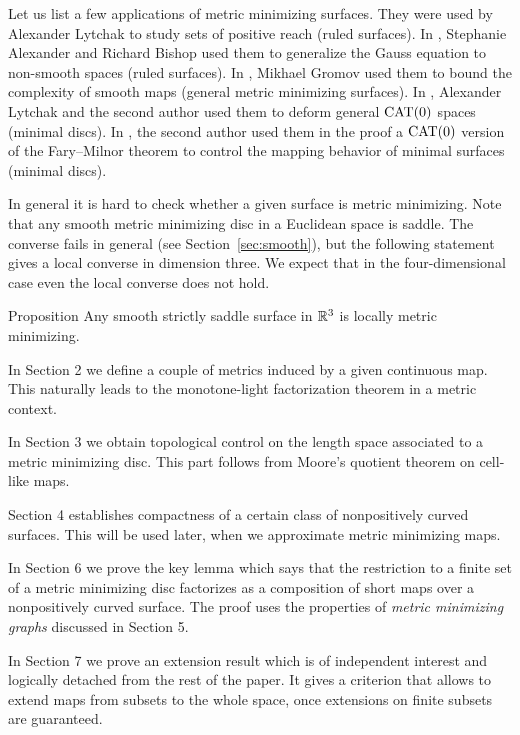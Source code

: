 \documentclass{article}
\begin{document}
Let us list a few applications of metric minimizing surfaces.
They were used by Alexander Lytchak \cite{L} to study sets of positive reach (ruled surfaces).
In  \cite{AB}, Stephanie Alexander and Richard Bishop used them to generalize the Gauss equation to non-smooth spaces (ruled surfaces).
In \cite{G}, Mikhael Gromov used them to bound the complexity of smooth maps (general metric minimizing surfaces).
In \cite{LS}, Alexander Lytchak and the second author used them to deform general $\mathop{\rm CAT}\nolimits(0)$ spaces (minimal discs).
In \cite{St}, the second author used them in the proof a $\mathop{\rm CAT}\nolimits(0)$ version of the Fary--Milnor theorem to control the mapping behavior of minimal surfaces (minimal discs).  

In general it is hard to check whether a given surface is metric minimizing.
Note that any smooth metric minimizing disc in a Euclidean space is saddle.
The converse fails in general (see Section~\ref{sec:smooth}), but the following statement gives a local converse in dimension three.
We expect that in the four-dimensional case even the local converse does not hold.

\begin{thm}{Proposition}\label{prop:smooth}
Any smooth strictly saddle surface in $\mathbb{R}^3$ is locally metric minimizing.
\end{thm}
 


In Section 2 we define a couple of metrics induced by a given continuous map.
This naturally leads to the monotone-light factorization theorem in a metric context.
 
In Section 3 we obtain topological control on the length space
associated to a metric minimizing disc. 
This part follows from Moore's quotient theorem on cell-like maps.
 
Section 4 establishes compactness of a certain class of nonpositively curved surfaces.
This will be used later, when we approximate metric minimizing maps.
 
In Section 6 we prove the key lemma which says that the restriction to a finite set of
a metric minimizing disc factorizes as a composition of short maps over a nonpositively curved surface.
The proof uses the properties of \emph{metric minimizing graphs} discussed in Section 5.
 
In Section 7 we prove an extension result which is of independent interest and logically detached
from the rest of the paper.
It gives a criterion that allows to extend maps from subsets
to the whole space, once extensions on finite subsets are guaranteed.
 
\end{document}
